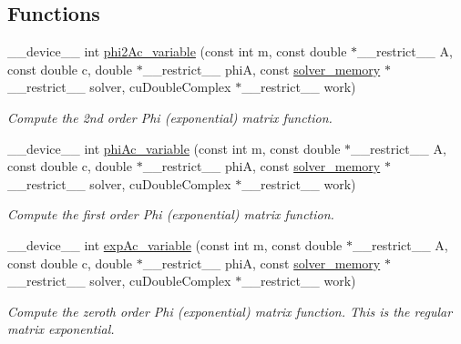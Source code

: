 \subsection*{Functions}
\begin{DoxyCompactItemize}
\item 
\+\_\+\+\_\+device\+\_\+\+\_\+ int \hyperlink{phiAHessenberg_8cu_ae7972d89009078777211b58162f2dd76}{phi2\+Ac\+\_\+variable} (const int m, const double $\ast$\+\_\+\+\_\+restrict\+\_\+\+\_\+ A, const double c, double $\ast$\+\_\+\+\_\+restrict\+\_\+\+\_\+ phiA, const \hyperlink{structsolver__memory}{solver\+\_\+memory} $\ast$\+\_\+\+\_\+restrict\+\_\+\+\_\+ solver, cu\+Double\+Complex $\ast$\+\_\+\+\_\+restrict\+\_\+\+\_\+ work)
\begin{DoxyCompactList}\small\item\em Compute the 2nd order Phi (exponential) matrix function. \end{DoxyCompactList}\item 
\+\_\+\+\_\+device\+\_\+\+\_\+ int \hyperlink{phiAHessenberg_8cu_abbb130c60c0fdda920f46468175a7904}{phi\+Ac\+\_\+variable} (const int m, const double $\ast$\+\_\+\+\_\+restrict\+\_\+\+\_\+ A, const double c, double $\ast$\+\_\+\+\_\+restrict\+\_\+\+\_\+ phiA, const \hyperlink{structsolver__memory}{solver\+\_\+memory} $\ast$\+\_\+\+\_\+restrict\+\_\+\+\_\+ solver, cu\+Double\+Complex $\ast$\+\_\+\+\_\+restrict\+\_\+\+\_\+ work)
\begin{DoxyCompactList}\small\item\em Compute the first order Phi (exponential) matrix function. \end{DoxyCompactList}\item 
\+\_\+\+\_\+device\+\_\+\+\_\+ int \hyperlink{phiAHessenberg_8cu_acf9f2fca33bcd8e9729601ed3761292a}{exp\+Ac\+\_\+variable} (const int m, const double $\ast$\+\_\+\+\_\+restrict\+\_\+\+\_\+ A, const double c, double $\ast$\+\_\+\+\_\+restrict\+\_\+\+\_\+ phiA, const \hyperlink{structsolver__memory}{solver\+\_\+memory} $\ast$\+\_\+\+\_\+restrict\+\_\+\+\_\+ solver, cu\+Double\+Complex $\ast$\+\_\+\+\_\+restrict\+\_\+\+\_\+ work)
\begin{DoxyCompactList}\small\item\em Compute the zeroth order Phi (exponential) matrix function. This is the regular matrix exponential. \end{DoxyCompactList}\end{DoxyCompactItemize}
